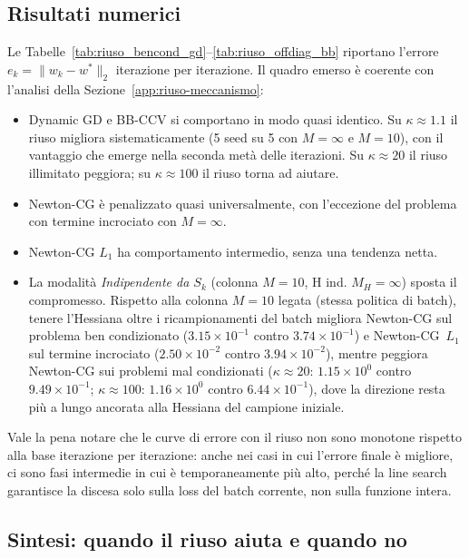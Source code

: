 \subsection{Risultati numerici}\label{app:riuso-risultati}

Le Tabelle~\ref{tab:riuso_bencond_gd}--\ref{tab:riuso_offdiag_bb} riportano
l'errore $e_k = \|w_k - w^*\|_2$ iterazione per iterazione. Il quadro
emerso è coerente con l'analisi della Sezione~\ref{app:riuso-meccanismo}:

\begin{itemize}
\item Dynamic GD e BB-CCV si comportano in modo quasi identico.
  Su $\kappa \approx 1.1$ il riuso migliora sistematicamente (5 seed su 5
  con $M=\infty$ e $M=10$), con il vantaggio che emerge nella seconda metà
  delle iterazioni. Su $\kappa \approx 20$ il riuso illimitato peggiora;
  su $\kappa \approx 100$ il riuso torna ad aiutare.
\item Newton-CG è penalizzato quasi universalmente, con l'eccezione
  del problema con termine incrociato con $M=\infty$.
\item Newton-CG $L_1$ ha comportamento intermedio, senza una
  tendenza netta.
\item La modalità \emph{Indipendente da $S_k$} (colonna $M{=}10$, H ind.
  $M_H{=}\infty$) sposta il compromesso. Rispetto alla colonna $M{=}10$ legata
  (stessa politica di batch), tenere l'Hessiana oltre i ricampionamenti del
  batch migliora Newton-CG sul problema ben condizionato
  ($3.15\times10^{-1}$ contro $3.74\times10^{-1}$) e Newton-CG~$L_1$ sul
  termine incrociato ($2.50\times10^{-2}$ contro $3.94\times10^{-2}$), mentre
  peggiora Newton-CG sui problemi mal condizionati ($\kappa\approx20$:
  $1.15\times10^{0}$ contro $9.49\times10^{-1}$; $\kappa\approx100$:
  $1.16\times10^{0}$ contro $6.44\times10^{-1}$), dove la direzione resta più
  a lungo ancorata alla Hessiana del campione iniziale.
\end{itemize}

Vale la pena notare che le curve di errore con il riuso non sono monotone
rispetto alla base iterazione per iterazione: anche nei casi in cui l'errore
finale è migliore, ci sono fasi intermedie in cui è temporaneamente più alto,
perché la line search garantisce la discesa solo sulla loss del batch corrente,
non sulla funzione intera.

\subsection{Sintesi: quando il riuso aiuta e quando no}\label{app:riuso-sintesi}

